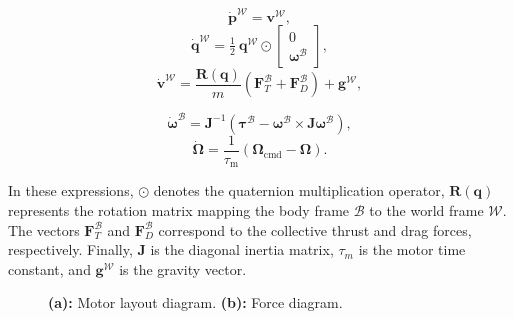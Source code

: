 \begin{minipage}{0.4\textwidth}
\begin{equation}
  \dot{\mathbf{p}}^{\mathcal{W}} = \mathbf{v}^{\mathcal{W}},
\end{equation}
\begin{equation}
    \dot{\mathbf{q}}^{\mathcal{W}} = \tfrac{1}{2}\ \mathbf{q}^{\mathcal{W}} \odot \begin{bmatrix} 0 \\ \boldsymbol{\omega}^{\mathcal{B}} \end{bmatrix},
\end{equation}
\begin{equation}
    \dot{\mathbf{v}}^{\mathcal{W}} = \frac{\mathbf{R}(\mathbf{q})}{m} \left( \mathbf{F}_T^{\mathcal{B}} + \mathbf{F}_D^{\mathcal{B}} \right) + \mathbf{g}^{\mathcal{W}},
\end{equation}
\end{minipage}%
\begin{minipage}{0.5\textwidth}
\begin{equation}
    \dot{\boldsymbol{\omega}}^{\mathcal{B}} = \mathbf{J}^{-1} \left( \boldsymbol{\tau}^{\mathcal{B}} - \boldsymbol{\omega}^{\mathcal{B}} \times \mathbf{J} \boldsymbol{\omega}^{\mathcal{B}} \right),
\end{equation}
\begin{equation}
  \dot{\mathbf{\Omega}} = \frac{1}{\tau_{\mathrm{m}}} \left(\mathbf{\Omega}_{\text{cmd}} - \mathbf{\Omega}\right).
\end{equation}
\end{minipage}

\noindent In these expressions, $\odot$ denotes the quaternion multiplication operator, $\mathbf{R}(\mathbf{q})$ represents the rotation matrix mapping the body frame $\mathcal{B}$ to the world frame $\mathcal{W}$.
The vectors $\mathbf{F}_T^{\mathcal{B}}$ and $\mathbf{F}_D^{\mathcal{B}}$ correspond to the collective thrust and drag forces, respectively.
Finally, $\mathbf{J}$ is the diagonal inertia matrix, $\tau_m$ is the motor time constant, and $\mathbf{g}^{\mathcal{W}}$ is the gravity vector.


\begin{figure}[H]
    \centering
    \scalebox{0.75}{%
        \begin{minipage}{\textwidth}
            \centering
            \subfloat[]{
                
                \label{fig:mot_layout}
            }
            \hfill
            \subfloat[]{
                
                \label{fig:drone_forces}
            }
        \end{minipage}
    }
    \caption{\textbf{(a):} Motor layout diagram. \textbf{(b):} Force diagram.}
    \label{f-diag}
\end{figure}

